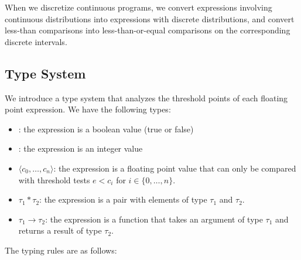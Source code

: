\documentclass[acmsmall,screen,dvipsnames,x11names,nonacm,anonymous,review]{acmart}
\newcommand{\bool}{\text{\ttfamily\bfseries bool}}
\newcommand{\intty}{\text{\ttfamily\bfseries int}}
\newcommand{\float}{\text{\ttfamily\bfseries float}}
\begin{document}
When we discretize continuous programs, we convert expressions involving continuous distributions into expressions with discrete distributions, and convert less-than comparisons into less-than-or-equal comparisons on the corresponding discrete intervals.

\subsection{Type System}\label{sec:type-system}

We introduce a type system that analyzes the threshold points of each floating point expression. We have the following types:
\begin{itemize}
    \item \bool: the expression is a boolean value (true or false)
    \item \intty: the expression is an integer value
    \item \float$\langle c_0, \ldots, c_n \rangle$: the expression is a floating point value that can only be compared with threshold tests $e < c_i$ for $i \in \{0, \ldots, n\}$.
    \item $\tau_1 * \tau_2$: the expression is a pair with elements of type $\tau_1$ and $\tau_2$.
    \item $\tau_1 \rightarrow \tau_2$: the expression is a function that takes an argument of type $\tau_1$ and returns a result of type $\tau_2$.
\end{itemize}

The typing rules are as follows:
\end{document}
